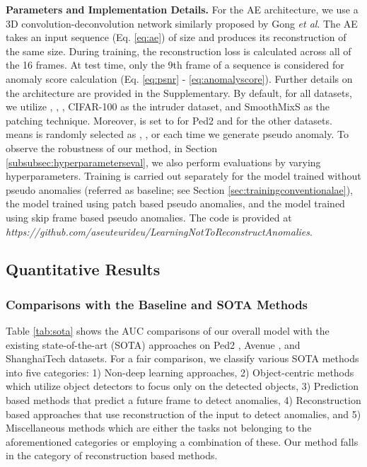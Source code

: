 \documentclass{bmvc2k}
\def\etal{\emph{et al}\bmvaOneDot}
\begin{document}
\noindent\textbf{Parameters and Implementation Details.}
For the AE architecture, we use a 3D convolution-deconvolution network similarly proposed by Gong \etal \cite{gong2019memorizing}. The AE takes an input sequence  (Eq. \eqref{eq:ae}) of size  and produces its reconstruction of the same size. During training, the reconstruction loss is calculated across all of the 16 frames. At test time, only the 9th frame of a sequence is considered for anomaly score calculation (Eq. \eqref{eq:psnr} - \eqref{eq:anomalyscore}). Further details on the architecture are provided in the Supplementary. 
By default, for all datasets, we utilize , , , CIFAR-100 \cite{krizhevsky2009learning} as the intruder dataset, and SmoothMixS \cite{lee2020smoothmix} as the patching technique. Moreover,  is set to  for Ped2 and  for the other datasets.  means  is randomly selected as , ,  or  each time we generate pseudo anomaly. 
To observe the robustness of our method, in Section \ref{subsubsec:hyperparameterseval}, we also perform evaluations by varying hyperparameters.
Training is carried out separately for the model trained without pseudo anomalies (referred as baseline; see Section \ref{sec:trainingconventionalae}), the model trained using patch based pseudo anomalies, and the model trained using skip frame based pseudo anomalies. 
The code is provided at \textit{https://github.com/aseuteurideu/LearningNotToReconstructAnomalies}.





\vspace{-3mm}
\subsection{Quantitative Results}
\label{subsec:sota}

\vspace{-1mm}
\subsubsection{Comparisons with the Baseline and SOTA Methods}
\vspace{-1mm}
Table \ref{tab:sota} shows the AUC comparisons of our overall model with the existing state-of-the-art (SOTA) approaches on Ped2 \cite{li2013anomaly}, Avenue \cite{lu2013abnormal}, and ShanghaiTech \cite{luo2017revisit} datasets. 
For a fair comparison, we classify various SOTA methods into five categories: 1) Non-deep learning approaches, 2) Object-centric methods which utilize object detectors to focus only on the detected objects, 3) Prediction based methods that predict a future frame to detect anomalies, 4) Reconstruction based approaches that use reconstruction of the input to detect anomalies, and 5) Miscellaneous methods which are either the tasks not belonging to the aforementioned categories or employing a combination of these. Our method falls in the category of reconstruction based methods. 
\end{document}
